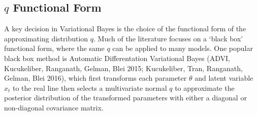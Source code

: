 \documentclass[12pt,a4paper]{article}%
\numberwithin{equation}{section}
\begin{document}
\subsection{$q$ Functional Form}
A key decision in Variational Bayes is the choice of the functional form of the approximating distribution $q$. Much of the literature focuses on a `black box' functional form, where the same $q$ can be applied to many models. One popular black box method is Automatic Differentation Variational Bayes (ADVI, Kucukeliber, Ranganath, Gelman, Blei 2015; Kucukeliber, Tran, Ranganath, Gelman, Blei 2016), which first transforms each parameter $\theta$ and latent variable $x_t$ to the real line then selects a multivariate normal $q$ to approximate the posterior distribution of the transformed parameters with either a diagonal or non-diagonal covariance matrix.  
\end{document}
